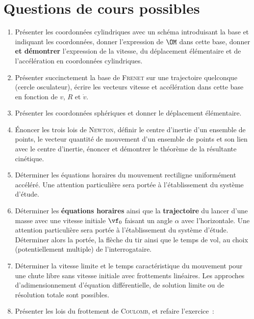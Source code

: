 \documentclass[a4paper, 12pt, final, garamond]{book}
\begin{document}
\section{Questions de cours possibles}
\begin{enumerate}[label=\sqenumi]
    \item Présenter les coordonnées cylindriques avec un schéma introduisant la
        base et indiquant les coordonnées, donner l'expression de $\OM$ dans
        cette base, donner \textbf{et démontrer} l'expression de la vitesse, du
        déplacement élémentaire et de l'accélération en coordonnées cylindriques.
    \item Présenter succinctement la base de \textsc{Frenet} sur une trajectoire
        quelconque (cercle osculateur), écrire les vecteurs vitesse et
        accélération dans cette base en fonction de $v$, $R$ et $\dot{v}$.
    \item Présenter les coordonnées sphériques et donner le déplacement
        élémentaire.
    \item Énoncer les trois lois de \textsc{Newton}, définir le centre d'inertie
        d'un ensemble de points, le vecteur quantité de mouvement d'un
        ensemble de points et son lien avec le centre d'inertie, énoncer et
        démontrer le théorème de la résultante cinétique.
    \item Déterminer les équations horaires du mouvement rectiligne uniformément
        accéléré. Une attention particulière sera portée à l'établissement du
        système d'étude.
    \item Déterminer les \textbf{équations horaires} ainsi que la
        \textbf{trajectoire} du lancer d'une masse avec une vitesse initiale
        $\vf_0$ faisant un angle $\alpha$ avec l'horizontale. Une attention
        particulière sera portée à l'établissement du système d'étude.
        Déterminer alors la portée, la flèche du tir ainsi que le temps de vol,
        au choix (potentiellement multiple) de l'interrogataire.
    \item Déterminer la vitesse limite et le temps caractéristique du mouvement
        pour une chute libre sans vitesse initiale avec frottements linéaires.
        Les approches d'adimensionnement d'équation différentielle, de solution
        limite ou de résolution totale sont possibles.
    \item Présenter les lois du frottement de \textsc{Coulomb}, et refaire
        l'exercice~:
\end{enumerate}
\end{document}
